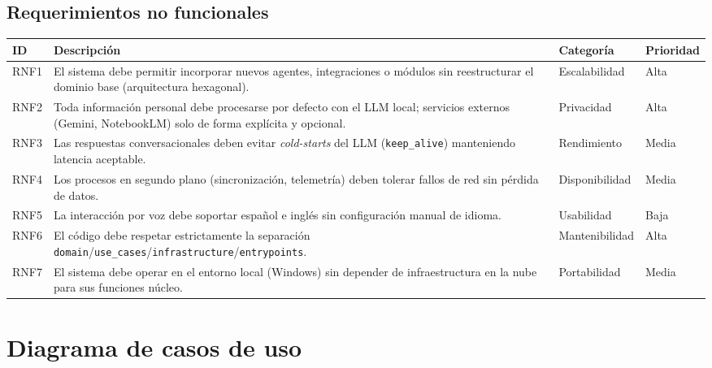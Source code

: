 \documentclass[11pt,a4paper]{article}
\begin{document}
\subsection{Requerimientos no funcionales}

\begin{longtable}{@{}p{1.3cm}p{8.2cm}p{2.4cm}p{1.5cm}@{}}
\toprule
ID & Descripción & Categoría & Prioridad \\
\midrule
\endhead
RNF1 & El sistema debe permitir incorporar nuevos agentes, integraciones o módulos sin reestructurar el dominio base (arquitectura hexagonal). & Escalabilidad & Alta \\
RNF2 & Toda información personal debe procesarse por defecto con el LLM local; servicios externos (Gemini, NotebookLM) solo de forma explícita y opcional. & Privacidad & Alta \\
RNF3 & Las respuestas conversacionales deben evitar \emph{cold-starts} del LLM (\texttt{keep\_alive}) manteniendo latencia aceptable. & Rendimiento & Media \\
RNF4 & Los procesos en segundo plano (sincronización, telemetría) deben tolerar fallos de red sin pérdida de datos. & Disponibilidad & Media \\
RNF5 & La interacción por voz debe soportar español e inglés sin configuración manual de idioma. & Usabilidad & Baja \\
RNF6 & El código debe respetar estrictamente la separación \texttt{domain}/\texttt{use\_cases}/\texttt{infrastructure}/\texttt{entrypoints}. & Mantenibilidad & Alta \\
RNF7 & El sistema debe operar en el entorno local (Windows) sin depender de infraestructura en la nube para sus funciones núcleo. & Portabilidad & Media \\
\bottomrule
\end{longtable}

\section{Diagrama de casos de uso}
\end{document}
